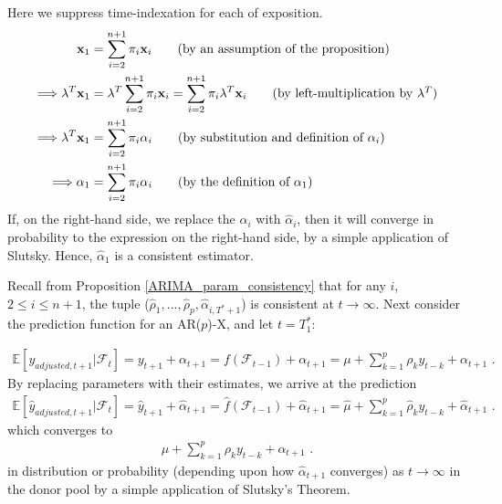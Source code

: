 \documentclass[11pt]{article}
\newcommand{\weight}{\pi}
\newcommand{\x}{\textbf{x}}
\def\E{\mathbb{E}} %
\theoremstyle{definition}
\newenvironment{proof-of-proposition}[1][{}]{\noindent{\bf
    Proof of Proposition {#1}}
  \hspace*{.5em}}{\qed\bigskip\\}
\begin{document}
  \begin{proof-of-proposition}[\ref{ARIMA_aggregated_alpha}]
    Here we suppress time-indexation for each of exposition.
    \begin{align}
      \x_{1} &= \sum^{n+1}_{i=2}\weight_{i}\x_{i} \tag{by an assumption of the proposition}\\
     \Longrightarrow \lambda^{T}\x_{1} &= \lambda^{T}\sum^{n+1}_{i=2}\weight_{i}\x_{i}  = \sum^{n+1}_{i=2}\weight_{i}\lambda^{T}\x_{i}\tag{by left-multiplication by $\lambda^{T}$}\\
      \Longrightarrow\lambda^{T}\x_{1} &=\sum^{n+1}_{i=2}\pi_{i}\alpha_{i}\tag{by substitution and definition of $\alpha_{i}$}\\
      \Longrightarrow\alpha_{1} &=\sum^{n+1}_{i=2}\pi_{i}\alpha_{i} \tag{by the definition of $\alpha_{1}$}
      \end{align} 
      If, on the right-hand side, we replace the $\alpha_{i}$ with $\hat\alpha_{i}$, then it will converge in probability to the expression on the right-hand side, by a simple application of Slutsky.  Hence, $\hat\alpha_{1}$ is a consistent estimator.
  \end{proof-of-proposition}

  \begin{proof-of-proposition}[\ref{ARIMA_conv_distribution}]

    Recall from Proposition \ref{ARIMA_param_consistency} that for any $i$, $2\leq i \leq n+1$, the tuple 
    ($\hat\rho_{1},...,\hat\rho_{p}, \hat\alpha_{i,T^{*}+1}$) is consistent at $t\rightarrow \infty$.  Next consider the prediction function for an AR($p$)-X, and let $t = T_{1}^{*}$:

    \begin{align*}
    \E[y_{adjusted,t+1}|\mathcal{F}_{t}] = y_{t+1} + \alpha_{t+1} = f(\mathcal{F}_{t-1}) + \alpha_{t+1} = \mu + \sum^{p}_{k=1}\rho_{k}y_{t-k} + \alpha_{t+1} \text{ .}
    \end{align*}
    By replacing parameters with their estimates, we arrive at the prediction 
    \begin{align*}
      \E[\hat{y}_{adjusted,t+1}|\mathcal{F}_{t}] = \hat{y}_{t+1} + \hat\alpha_{t+1} = \hat{f}(\mathcal{F}_{t-1}) + \hat\alpha_{t+1} = \hat\mu + \sum^{p}_{k=1}\hat\rho_{k}y_{t-k} + \hat{\alpha}_{t+1} \text{ .}
      \end{align*}
    which converges to 
    \begin{align*}
       \mu + \sum^{p}_{k=1}\rho_{k}y_{t-k} + \alpha_{t+1} \text{ .}
      \end{align*}
    in distribution or probability (depending upon how $\hat\alpha_{t+1}$ converges) as $t\rightarrow\infty$ in the donor pool by a simple application of Slutsky's Theorem.
    
    \end{proof-of-proposition}
    
  
\clearpage


 
\end{document}
